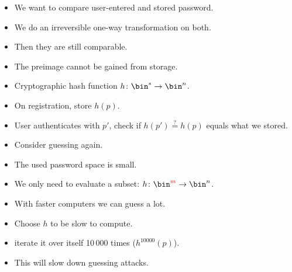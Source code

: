 \begin{frame}
  \begin{solution}[Passwords]
    \begin{itemize}
      \item We want to compare user-entered and stored password.
      \item We do an irreversible one-way transformation on both.
      \item Then they are still comparable.
      \item The preimage cannot be gained from storage.
    \end{itemize}
  \end{solution}

  \pause{}

  \begin{example}
    \begin{itemize}
      \item Cryptographic hash function \(h\colon \bin^*\to \bin^n\).
      \item On registration, store \(h(p)\).
      \item User authenticates with \(p'\), check if \(h(p') \stackrel{?}{=}  
          h(p)\) equals what we stored.
    \end{itemize}
  \end{example}
\end{frame}

\begin{frame}
  \begin{remark}
    \begin{itemize}
      \item Consider guessing again.
      \item The used password space is small.
      \item We only need to evaluate a subset: \(h\colon 
          \bin^{\color{red}{m}}\to \bin^n\).
      \item With faster computers we can guess a lot.
    \end{itemize}
  \end{remark}

  \pause

  \begin{solution}
    \begin{itemize}
      \item Choose \(h\) to be slow to compute.
      \item \Eg iterate it over itself 10\,000 times (\(h^{10000}(p)\)).
      \item This will slow down guessing attacks.
    \end{itemize}
  \end{solution}
\end{frame}

